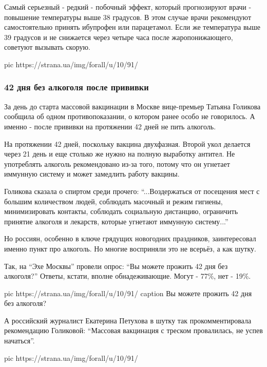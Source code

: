 Самый серьезный - редкий - побочный эффект, который прогнозируют врачи -
повышение температуры выше 38 градусов. В этом случае врачи рекомендуют
самостоятельно принять ибупрофен или парацетамол. Если же температура выше 39
градусов и не снижается через четыре часа после жаропонижающего, советуют
вызывать скорую. 

\ifcmt
pic https://strana.ua/img/forall/u/10/91/%
\fi

\subsubsection{42 дня без алкоголя после прививки }

За день до старта массовой вакцинации в Москве вице-премьер Татьяна Голикова
сообщила об одном противопоказании, о котором ранее особо не говорилось. А
именно - после прививки на протяжении 42 дней не пить алкоголь. 

На протяжении 42 дней, поскольку вакцина двухфазная. Второй укол делается через
21 день и еще столько же нужно на полную выработку антител. Не употреблять
алкоголь рекомендовано из-за того, потому что он угнетает иммунную систему и
может замедлить работу вакцины. 

Голикова сказала о спиртом среди прочего: \enquote{...Воздержаться от посещения мест с
большим количеством людей, соблюдать масочный и режим гигиены, минимизировать
контакты, соблюдать социальную дистанцию, ограничить принятие алкоголя и
лекарств, которые угнетают иммунную систему...}

Но россиян, особенно в ключе грядущих новогодних праздников, заинтересовал
именно пункт про алкоголь. Но многие восприняли это не всерьёз, а как шутку.

Так, на \enquote{Эхе Москвы} провели опрос: \enquote{Вы можете прожить 42 дня без алкоголя?}
Ответы, кстати, вполне обнадеживающие. Могут - 77\%, нет - 19\%. 

\ifcmt
pic https://strana.ua/img/forall/u/10/91/%
caption Вы можете прожить 42 дня без алкоголя?
\fi

А российский журналист Екатерина Петухова в шутку так прокомментировала
рекомендацию Голиковой: \enquote{Массовая вакцинация с треском провалилась, не
успев начаться}. 

\ifcmt
pic https://strana.ua/img/forall/u/10/91/%
\fi

